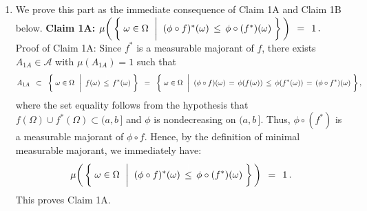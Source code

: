 \begin{enumerate}
\item
	We prove this part as the immediate consequence of Claim 1A and Claim 1B below.
	\vskip 0.3cm
	\noindent
	\textbf{Claim 1A:}\quad
	$\mu\!\left(\,\left\{\;
		\omega \in \Omega
		\,\;\left\vert\;\;
		(\phi \circ f)^{*}(\omega) \,\overset{{\color{white}\vert}}{\leq}\, \phi \circ (f^{*})(\omega)
		\right.
	\,\right\}\,\right)
	\,\;=\;\, 1\,.$
	\vskip 0.2cm
	\noindent
	Proof of Claim 1A:\;\;
	Since $f^{*}$ is a measurable majorant of $f$,
	there exists $A_{1A} \in \mathcal{A}$ with $\mu(A_{1A}) = 1$ such that
	\begin{equation*}
	A_{1A}
	\;\;\subset\;\;
		\left\{\;
			\omega \in \Omega
			\,\;\left\vert\;\;
			f(\omega) \,\overset{{\color{white}\vert}}{\leq}\, f^{*}(\omega)
		\right.
		\,\right\}
	\;\; = \;\;
		\left\{\;
			\omega \in \Omega
			\,\;\left\vert\;\;
			(\phi \circ f)(\omega) \,=\, \phi(f(\omega)) \,\overset{{\color{white}\vert}}{\leq}\, \phi(f^{*}(\omega)) \,=\, (\phi \circ f^{*})(\omega)
		\right.
		\,\right\},
	\end{equation*}
	where the set equality follows from the hypothesis that $f(\Omega) \cup f^{*}(\Omega) \subset (a,b\,]$
	and $\phi$ is nondecreasing on $(a,b\,]$.
	Thus, $\phi \circ (f^{*})$ is a measurable majorant of $\phi \circ f$.
	Hence, by the definition of minimal measurable majorant, we immediately have:
	\begin{equation*}
	\mu\!\left(\,\left\{\;
		\omega \in \Omega
		\,\;\left\vert\;\;
		(\phi \circ f)^{*}(\omega) \,\overset{{\color{white}\vert}}{\leq}\, \phi \circ (f^{*})(\omega)
		\right.
	\,\right\}\,\right)
	\,\;=\;\, 1\,.
	\end{equation*}
	This proves Claim 1A.


\end{enumerate}
